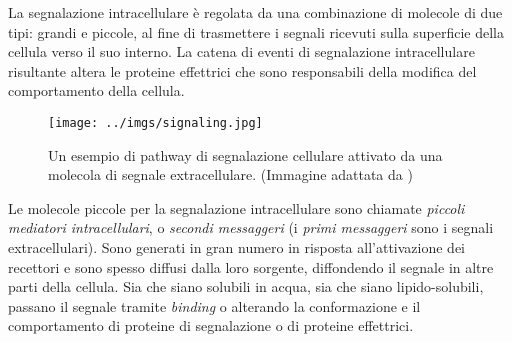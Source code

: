 La segnalazione intracellulare è regolata da una combinazione di molecole di due tipi: grandi e piccole, al fine di trasmettere i segnali ricevuti sulla superficie della cellula verso il suo interno.
La catena di eventi di segnalazione intracellulare risultante altera le proteine effettrici che sono responsabili della modifica del comportamento della cellula. 

\begin{figure}[h]
\begin{center}
\texttt{[image: ../imgs/signaling.jpg]}
\caption[Vie di trasduzione del segnale]{Un esempio di pathway di segnalazione cellulare attivato da una molecola di segnale extracellulare. (Immagine adattata da \cite{alberts2000molecular})}
\label{Fig:signaling}
\end{center}
\end{figure}

Le molecole piccole per la segnalazione intracellulare sono chiamate \textit{piccoli mediatori intracellulari}, o \textit{secondi messaggeri} (i \textit{primi messaggeri} sono i segnali extracellulari). 
Sono generati in gran numero in risposta all'attivazione dei recettori e sono spesso diffusi dalla loro sorgente, diffondendo il segnale in altre parti della cellula.
Sia che siano solubili in acqua, sia che siano lipido-solubili, passano il segnale tramite \textit{binding} o alterando la conformazione e il comportamento di proteine di segnalazione o di proteine effettrici.

